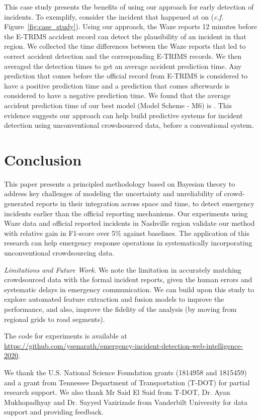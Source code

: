 \documentclass[conference]{IEEEtran}
\newcommand{\spara}[1]{\smallskip\noindent{\bf #1}}
\begin{document}
This case study presents the benefits of using our approach for early detection of incidents. To exemplify, consider the incident that happened at  on  (\textit{c.f.} Figure~\ref{fig:case_study}). 
Using our approach, the Waze reports 12 minutes before the E-TRIMS accident record can detect the plausibility of an incident in that region.  We collected the time differences between the Waze reports that led to correct accident detection and the corresponding E-TRIMS records. We then averaged the detection times to get an average accident prediction time. Any prediction that comes before the official record from E-TRIMS is considered to have a positive  prediction time and a prediction that comes afterwards is considered to have a negative prediction time. We found that the average accident prediction time of our best model (Model Scheme - M6) is . 
This evidence suggests our approach can help build predictive systems for incident detection using unconventional crowdsourced data, before a conventional system. 

\section{Conclusion}
\label{sec: conclusion}
This paper presents a principled methodology based on Bayesian theory to address key challenges of modeling the uncertainty and unreliability of crowd-generated reports in their integration across space and time, to detect emergency incidents earlier than the official reporting mechanisms.   
Our experiments using Waze data and official reported incidents in Nashville region validate our method with relative gain in F1-score over 5\% against baselines. 
The application of this research can help emergency response operations in systematically incorporating unconventional crowdsourcing data. 

\textit{Limitations and Future Work}. 
We note the limitation in accurately matching crowdsourced data with the formal incident reports, given the human errors and systematic delays in emergency communication. We can build upon this study to explore automated feature extraction and fusion models to improve the performance, and also, improve the fidelity of the analysis (by moving from regional grids to road segments). 





\spara{Reproducibility.} The code for experiments is available at \url{https://github.com/ysenarath/emergency-incident-detection-web-intelligence-2020}.

\balance

\spara{Acknowledgement.} 
We thank the U.S. National Science Foundation grants (1814958 and 1815459) and a grant from Tennessee Department of Transportation (T-DOT) for partial research support. We also thank Mr Said El Said from T-DOT, Dr. Ayan Mukhopadhyay and Dr. Sayyed Vazirizade from Vanderbilt University for data support and providing feedback.









\end{document}

